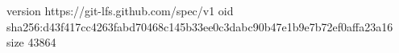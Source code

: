 version https://git-lfs.github.com/spec/v1
oid sha256:d43f417cc4263fabd70468c145b33ee0c3dabc90b47e1b9e7b72ef0affa23a16
size 43864
